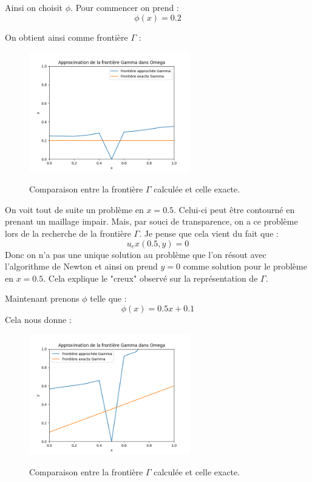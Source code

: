 \documentclass{article}
\begin{document}
Ainsi on choisit $\phi$. Pour commencer on prend :
\begin{equation}
    \phi(x) = 0.2
\end{equation}

On obtient ainsi comme frontière $\Gamma$ :
\begin{figure}[h]
  \centering
  \includegraphics[width=7cm]{frontiere_Gamma_constante.png}
  \label{fig/domaine}
  \caption{Comparaison entre la frontière $\Gamma$ calculée et celle exacte.}
\end{figure}

\vspace{1cm}
On voit tout de suite un problème en $x = 0.5$. Celui-ci peut être contourné en prenant un maillage impair. Mais, par souci de transparence, on a ce problème lors de la recherche de la frontière $\Gamma$. Je pense que cela vient du fait que :
\begin{equation}
    u_ex(0.5,y) = 0
\end{equation}
Donc on n'a pas une unique solution au problème que l'on résout avec l'algorithme de Newton et ainsi on prend $y = 0$ comme solution pour le problème en $x = 0.5$. Cela explique le "creux" observé sur la représentation de $\Gamma$.


Maintenant prenons $\phi$ telle que :
\begin{equation}
    \phi(x) = 0.5x + 0.1
\end{equation}
Cela nous donne :
\begin{figure}[h]
  \centering
  \includegraphics[width=7cm]{frontiere_Gamma_affine.png}
  \label{fig/domaine}
  \caption{Comparaison entre la frontière $\Gamma$ calculée et celle exacte.}
\end{figure}
\end{document}

